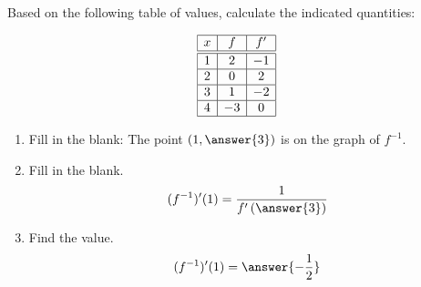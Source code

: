 \documentclass{ximera}
\author{Steven Gubkin\and nela Lakos}
\begin{document}
\begin{exercise}

Based on the following table of values, calculate the indicated quantities:

 \[
  \begin{array}{|c|c|c|}\hline
    x & f  & f' \\ \hline \hline
    1 & 2 & -1 \\ \hline
    2 & 0  & 2  \\ \hline
    3 & 1  & -2 \\ \hline
    4 & -3 & 0  \\ \hline
  \end{array}
  \]
\begin{enumerate}
\item Fill in the blank: The point $(1, \answer{3})$ is on the graph of $f^{-1}$.


\item Fill in the blank.
\[
(f^{-1})'(1) = \frac{1}{f'\left(\answer{3}\right)}
\]

\item Find the value.
\[
(f^{-1})'(1) = \answer{-\frac{1}{2}}
\]
\end{enumerate}
\end{exercise}
\end{document}
